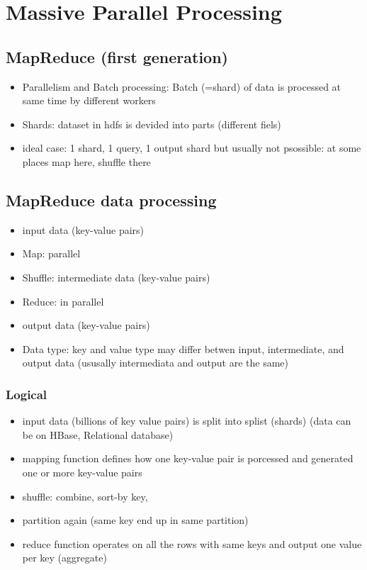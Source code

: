 \section{Massive Parallel Processing}

\subsection{MapReduce (first generation)}
\begin{itemize}
    \item Parallelism and Batch processing: Batch (=shard) of data is processed at same time by different workers
    \item Shards: dataset in hdfs is devided into parts (different fiels)
    \item ideal case: 1 shard, 1 query, 1 output shard but usually not psossible: at some places map here, shuffle there
\end{itemize}

\subsection{MapReduce data processing}
\begin{itemize}
    \item input data (key-value pairs)
    \item Map: parallel
    \item Shuffle: intermediate data (key-value pairs)
    \item Reduce: in parallel
    \item output data (key-value pairs)
    \item Data type: key and value type may differ betwen input, intermediate, and output data (ususally intermediata and output are the same)

\end{itemize}
\subsubsection{Logical}
\begin{itemize}
    \item input data (billions of key value pairs) is split into splist (shards) 
    (data can be on HBase, Relational database)
    \item mapping function defines how one key-value pair is porcessed and generated one or more key-value pairs
    \item shuffle: combine, sort-by key,
    \item partition again (same key end up in same partition)
    \item reduce function operates on all the rows with same keys and output one value per key (aggregate)
\end{itemize}

